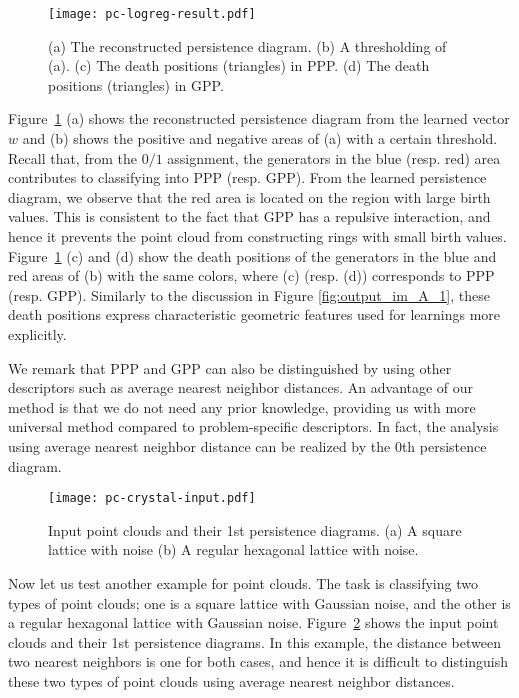 \documentclass[smallextended]{svjour3}
\begin{document}
\begin{figure}[htbp]
  \centering
  \texttt{[image: pc-logreg-result.pdf]}
  \caption{
    (a) The reconstructed persistence diagram. (b) A thresholding of (a).
    (c) The death positions (triangles) in PPP. (d) The death positions (triangles) in GPP.}
  \label{fig:output_pc_logreg}
\end{figure}


Figure~\ref{fig:output_pc_logreg} (a) shows the reconstructed persistence diagram from the learned vector $w$ and (b) shows the positive and negative areas of (a) with a certain threshold. 
Recall that, from the $0/1$ assignment,  the generators in the blue (resp. red) area contributes to classifying into PPP (resp. GPP).
From the learned persistence diagram, we observe that the red area  is located on the region with large birth values. This is consistent to the fact that GPP has a repulsive interaction, and hence it prevents the point cloud from constructing rings with small birth values. Figure~\ref{fig:output_pc_logreg} (c) and (d) show the death positions of the generators in the blue and red areas of (b) with the same colors, where (c) (resp. (d)) corresponds to PPP (resp. GPP). Similarly to the discussion in Figure 
\ref{fig:output_im_A_1}, these death positions express characteristic geometric features used for learnings more explicitly. 








We remark that PPP and GPP can also be distinguished by using other descriptors such as average nearest neighbor distances. An advantage of our method is that we do not need any prior knowledge, providing us with more universal method compared to problem-specific descriptors. In fact, the analysis using average nearest neighbor distance can be realized by the $0$th persistence diagram. 

\begin{figure}[htbp]
  \centering
  \texttt{[image: pc-crystal-input.pdf]}
  \caption{Input point clouds and their 1st persistence diagrams.
  (a) A square lattice with noise (b) A regular hexagonal lattice with noise.}
  \label{fig:pc-crystal-input}
\end{figure}

Now let us test another example for point clouds. The task is classifying two types of point clouds; one is a square lattice with Gaussian noise, and the other is a regular hexagonal lattice with Gaussian noise. Figure~\ref{fig:pc-crystal-input} shows
the input point clouds and their 1st persistence diagrams. In this example, the distance between two nearest neighbors is one for both cases, and hence it is difficult to distinguish these two types of point clouds using average nearest neighbor distances. 
\end{document}
